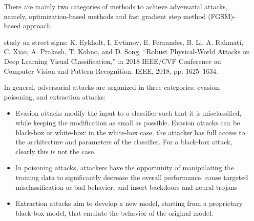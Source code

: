 There are mainly two categories of methods to achieve adversarial attacks, namely, optimization-based methods and fast gradient step method (FGSM)-based approach.


study on street signs: K. Eykholt, I. Evtimov, E. Fernandes, B. Li, A. Rahmati, C. Xiao,
A. Prakash, T. Kohno, and D. Song, “Robust Physical-World Attacks on
Deep Learning Visual Classification,” in 2018 IEEE/CVF Conference on
Computer Vision and Pattern Recognition. IEEE, 2018, pp. 1625–1634.


In general, adversarial attacks are organized in three categories: evasion, poisoning, and extraction attacks:
\begin{itemize}
    \item Evasion attacks modify the input to a classifier such that it is misclassified, while keeping the modification as small as possible. Evasion attacks can be black-box or white-box: in the white-box case, the attacker has full access to the architecture and parameters of the classifier. For a black-box attack, clearly this is not the case.
    \item In poisoning attacks, attackers have the opportunity of manipulating the training data to significantly decrease the overall performance, cause targeted misclassification or bad behavior, and insert backdoors and neural trojans
    \item Extraction attacks aim to develop a new model, starting from a proprietary black-box model, that emulate the behavior of the original model.
\end{itemize}
